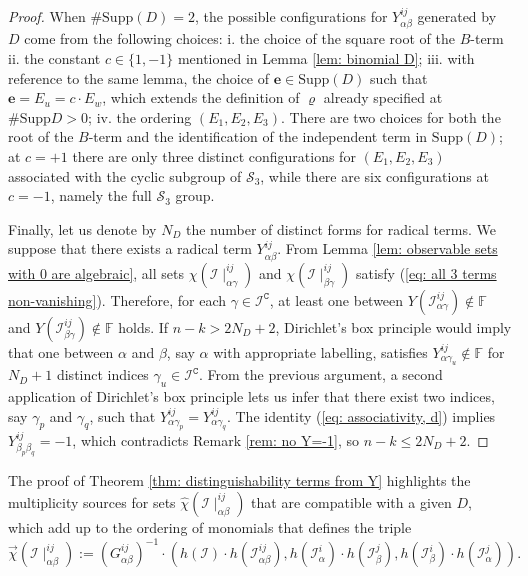 \documentclass[10pt]{article}
\theoremstyle{remark}%
\theoremstyle{definition}%
\begin{document}
\begin{proof}
When $\#\mathrm{Supp}(D)=2$, the possible configurations for $Y_{\alpha\beta}^{ij}$ generated by $D$ come from the following choices: i. the choice of the square root of the $B$-term 
ii. the constant $c\in\{1,-1\}$ mentioned in Lemma \ref{lem: binomial D}; iii. with reference to the same lemma, 
the choice of $\mathbf{e}\in\mathrm{Supp}(D)$ such that $\mathbf{e}=E_{u}=c\cdot E_{w}$, which extends the definition of $\varrho$ already specified at $\#\mathrm{Supp}D>0$; iv. the ordering $(E_{1},E_{2},E_{3})$. There are two choices for both the root of the $B$-term and the identification of the independent term in $\mathrm{Supp}(D)$; at $c=+1$ there are only three distinct configurations for $(E_{1},E_{2},E_{3})$ associated with the cyclic subgroup of $\mathcal{S}_{3}$, while there are six configurations at $c=-1$, namely the full $\mathcal{S}_{3}$ group. 

Finally, let us denote by $N_{D}$ the number of distinct forms 
for radical terms. We suppose that there exists a radical term $Y_{\alpha\beta}^{ij}$. From Lemma \ref{lem: observable sets with 0 are algebraic}, all sets $\chi(\mathcal{I}\mid_{\alpha\gamma}^{ij})$ and $\chi(\mathcal{I}\mid_{\beta\gamma}^{ij})$ satisfy (\ref{eq: all 3 terms non-vanishing}). Therefore, for each $\gamma\in\mathcal{I}^{\mathtt{C}}$, at least one between $Y(\mathcal{I}_{\alpha\gamma}^{ij})\notin \mathbb{F}$ and $Y(\mathcal{I}_{\beta\gamma}^{ij})\notin \mathbb{F}$ holds. If $n-k > 2 N_{D}+2$, Dirichlet's box principle would imply that one between $\alpha$ and $\beta$, say $\alpha$ with appropriate labelling, satisfies $Y_{\alpha\gamma_{u}}^{ij}\notin \mathbb{F}$ for $N_{D}+1$ distinct indices $\gamma_{u}\in \mathcal{I}^{\mathtt{C}}$. From the previous argument, a second application of Dirichlet's box principle lets us infer that there exist two indices, say $\gamma_{p}$ and $\gamma_{q}$, such that $Y_{\alpha\gamma_{p}}^{ij}=Y_{\alpha\gamma_{q}}^{ij}$. The identity (\ref{eq: associativity, d}) implies $Y_{\beta_{p}\beta_{q}}^{ij}=-1$, which contradicts Remark \ref{rem: no Y=-1}, so $n-k\leq 2 N_{D}+2$. 
\end{proof}
The proof of Theorem \ref{thm: distinguishability terms from Y} highlights the multiplicity sources for sets $\hat{\chi}(\mathcal{I}\mid_{\alpha\beta}^{ij})$ that are compatible with a given $D$, which add up to the ordering of monomials that defines the triple
 \begin{equation}
\overrightarrow{\chi}(\mathcal{I}\mid_{\alpha\beta}^{ij}):=(G_{\alpha\beta}^{ij})^{-1}\cdot\left(h(\mathcal{I})\cdot h(\mathcal{I}_{\alpha\beta}^{ij}),h(\mathcal{I}_{\alpha}^{i})\cdot h(\mathcal{I}_{\beta}^{j}),h(\mathcal{I}_{\beta}^{i})\cdot h(\mathcal{I}_{\alpha}^{j})\right).\label{eq: three-set triple}
 \end{equation}
\end{document}
